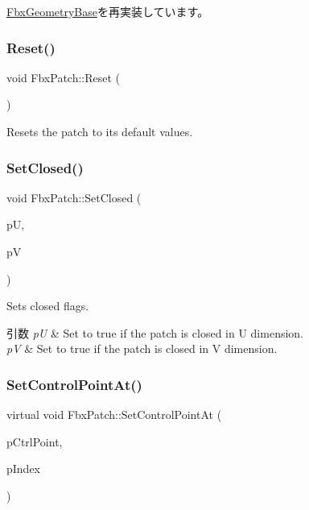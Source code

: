 \hyperlink{class_fbx_geometry_base_a471b736f2595c006a338c07a61907127}{Fbx\+Geometry\+Base}を再実装しています。

\mbox{\label{class_fbx_patch_a8a1fb844916976ff4e0396e140e30bcf}} 
\subsubsection{\texorpdfstring{Reset()}{Reset()}}
{\footnotesize\ttfamily void Fbx\+Patch\+::\+Reset (\begin{DoxyParamCaption}{ }\end{DoxyParamCaption})}



Resets the patch to its default values. 

\mbox{\label{class_fbx_patch_af3d5e55f5523f2872b7fbb8082200f9b}} 
\subsubsection{\texorpdfstring{Set\+Closed()}{SetClosed()}}
{\footnotesize\ttfamily void Fbx\+Patch\+::\+Set\+Closed (\begin{DoxyParamCaption}\item[{bool}]{pU,  }\item[{bool}]{pV }\end{DoxyParamCaption})}

Sets closed flags. 
\begin{DoxyParams}{引数}
{\em pU} & Set to {\ttfamily true} if the patch is closed in U dimension. \\
\hline
{\em pV} & Set to {\ttfamily true} if the patch is closed in V dimension. \\
\hline
\end{DoxyParams}
\mbox{\label{class_fbx_patch_a43bd49dba561cff8f166b8f7a12816f6}} 
\subsubsection{\texorpdfstring{Set\+Control\+Point\+At()}{SetControlPointAt()}}
{\footnotesize\ttfamily virtual void Fbx\+Patch\+::\+Set\+Control\+Point\+At (\begin{DoxyParamCaption}\item[{const \hyperlink{class_fbx_vector4}{Fbx\+Vector4} \&}]{p\+Ctrl\+Point,  }\item[{int}]{p\+Index }\end{DoxyParamCaption})\hspace{0.3cm}{\ttfamily [virtual]}}

